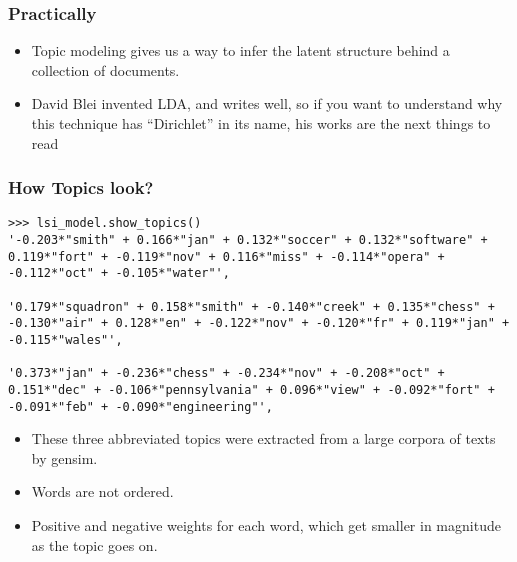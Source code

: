 \begin{frame}[fragile]\frametitle{Practically}
  \begin{itemize}
	\item Topic modeling gives us a way to infer the latent structure behind a collection of documents.
	\item David Blei invented LDA, and writes well, so if you want to understand why this technique has ``Dirichlet'' in its name, his works are the next things to read
  \end{itemize}
\end{frame}
\begin{frame}[fragile]\frametitle{How Topics look?}
\begin{lstlisting}
>>> lsi_model.show_topics()
'-0.203*"smith" + 0.166*"jan" + 0.132*"soccer" + 0.132*"software" + 0.119*"fort" + -0.119*"nov" + 0.116*"miss" + -0.114*"opera" + -0.112*"oct" + -0.105*"water"',

'0.179*"squadron" + 0.158*"smith" + -0.140*"creek" + 0.135*"chess" + -0.130*"air" + 0.128*"en" + -0.122*"nov" + -0.120*"fr" + 0.119*"jan" + -0.115*"wales"', 

'0.373*"jan" + -0.236*"chess" + -0.234*"nov" + -0.208*"oct" + 0.151*"dec" + -0.106*"pennsylvania" + 0.096*"view" + -0.092*"fort" + -0.091*"feb" + -0.090*"engineering"',
\end{lstlisting}
  \begin{itemize}
  	\item These three abbreviated topics were extracted from a large corpora of texts by gensim.
	\item Words are not ordered.
	\item Positive and negative weights for each word, which get smaller in magnitude as the topic goes on. 

  \end{itemize}
\end{frame}

